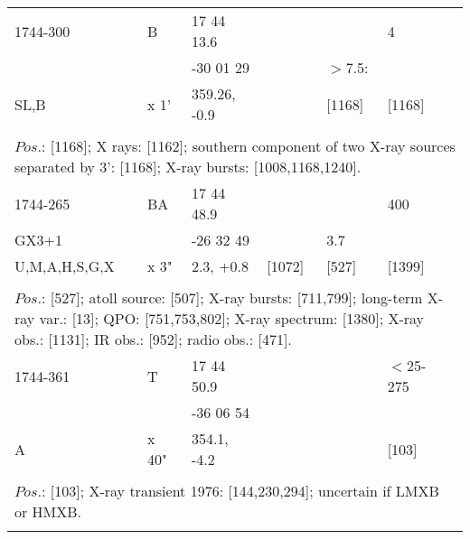 \documentclass{aa}
\begin{document}
\begin{tabular}{p{2.5cm}p{1cm}p{1.8cm}p{2.3cm}p{3.3cm}p{2.0cm}p{2.2cm}}
\noalign{\smallskip}
1744-300        & B          & 17 44 13.6         &                    &                           & 4              &          \\
                         &              & -30 01 29           &                    & $>$7.5:             &                 &         \\
SL,B                & x 1'      & 359.26, -0.9       &                    & [1168]               & [1168]     &         \\
\\
\multicolumn{7}{p{17.5cm}}{
$Pos$.: [1168]; X rays: [1162]; southern component of two X-ray sources separated by 3': [1168]; X-ray bursts: 
[1008,1168,1240].}\\
\noalign{\smallskip}
\hline

\noalign{\smallskip}
1744-265              & BA            & 17 44 48.9            &                      &                          & 400                 &          \\
GX3+1                  &                   & -26 32 49              &                      & 3.7                    &                        &         \\
U,M,A,H,S,G,X    & x 3"          & 2.3, +0.8                & [1072]          & [527]                & [1399]            &         \\
\\
\multicolumn{7}{p{17.5cm}}{
$Pos$.: [527]; atoll source: [507]; X-ray bursts: [711,799]; long-term X-ray var.: [13]; QPO: [751,753,802]; 
X-ray spectrum: [1380]; X-ray obs.: [1131]; IR obs.: [952]; radio obs.: [471].}\\
\noalign{\smallskip}
\hline

\noalign{\smallskip}
1744-361        & T            & 17 44 50.9           &                   &                             & $<$25-275           &          \\
                         &                & -36 06 54             &                   &                             &                               &         \\
A                      & x 40"      & 354.1, -4.2          &                   &                             & [103]                        &          \\
\\
\multicolumn{7}{p{17.5cm}}{
$Pos$.: [103]; X-ray transient 1976: [144,230,294]; uncertain if LMXB or HMXB.}\\
\noalign{\smallskip}
\hline


\end{tabular}
\end{document}
